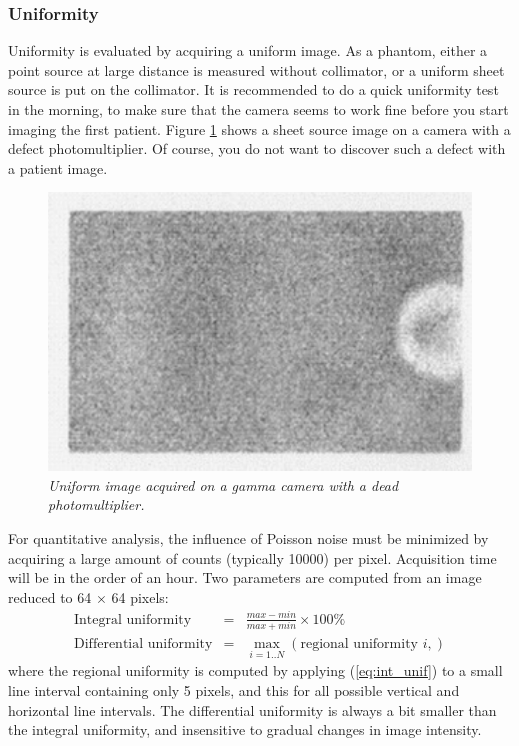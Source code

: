 \subsubsection{Uniformity}
Uniformity is evaluated by acquiring a uniform image. As a phantom, either
a point source at large distance is measured without collimator, or a
uniform sheet source is put on the collimator. It is recommended to do a quick
uniformity test in the morning, to make sure that the camera seems to work
fine before you start imaging the first patient. Figure \ref{fig:qc_pmt} shows
a sheet source image on a camera with a defect photomultiplier. Of course, you
do not want to discover such a defect with a patient image.
%
\begin{figure}[tb]
\centering
\includegraphics[width=\figone]{figs/fig_qc_pmt.pdf}
\caption{\label{fig:qc_pmt} \emph{Uniform image acquired on a gamma camera
with a dead photomultiplier.}}
\end{figure}

For quantitative analysis, the influence of Poisson noise must be minimized by
acquiring a large amount of counts (typically 10000) per pixel. Acquisition
time will be in the order of an hour. Two parameters are computed from an
image reduced to 64 $\times$ 64 pixels:
\begin{eqnarray}
 \mbox{Integral uniformity} & = & \frac{max - min}{max + min} \times 100 \%
      \label{eq:int_unif}\\
 \mbox{Differential uniformity} & = & \max_{i=1..N} \left( \mbox{regional
 uniformity $i$}, \right)
\end{eqnarray}
where the regional uniformity is computed by applying (\ref{eq:int_unif}) to a
small line interval containing only 5 pixels, and this for all possible
vertical and horizontal line intervals. The differential uniformity is always
a bit smaller than the integral uniformity, and insensitive to gradual changes
in image intensity.

